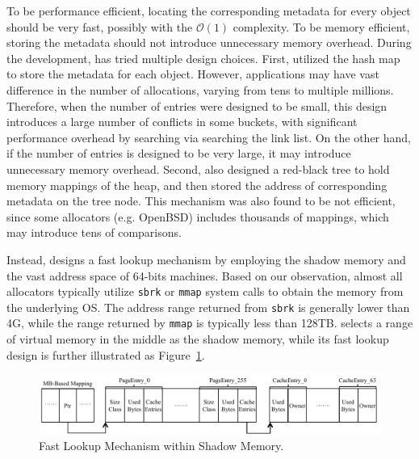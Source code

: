 To be performance efficient, locating the corresponding metadata for every object should be very fast, possibly with the 
$\mathcal{O}(1)$ 
complexity.  To be memory efficient, storing the metadata should not introduce unnecessary memory overhead. During the development, \MP{} has tried multiple design choices. First, \MP{} utilized the hash map to store the metadata for each object. However, applications may have vast difference in the number of allocations, varying from tens to multiple millions. Therefore, when the number of entries were designed to be small, this design introduces a large number of conflicts in some buckets, with significant performance overhead by searching via searching the link list. On the other hand, if the number of entries is designed to be very large, it may introduce unnecessary memory overhead. Second, \MP{} also designed a red-black tree to hold memory mappings of the heap, and then stored the address of corresponding metadata on the tree node. This mechanism was also found to be not efficient, since some allocators (e.g. OpenBSD)  includes thousands of mappings, which may introduce tens of comparisons. 

Instead, \MP{} designs a fast lookup mechanism by employing the shadow memory and the vast address space of 64-bits machines. Based on our observation, almost all allocators typically utilize \texttt{sbrk} or \texttt{mmap} system calls to obtain the memory from the underlying OS. The address range returned from \texttt{sbrk} is generally lower than 4G, while the range returned by \texttt{mmap} is typically less than 128TB. 
\MP{} selects a range of virtual memory in the middle as the shadow memory, while its fast lookup design is further illustrated as Figure~\ref{fig:lookup}. 
          
\begin{figure}[!ht]
\centering
\includegraphics[width=6.3in]{figures/lookup}
\caption{Fast Lookup Mechanism within Shadow Memory.\label{fig:lookup}}
\end{figure}

